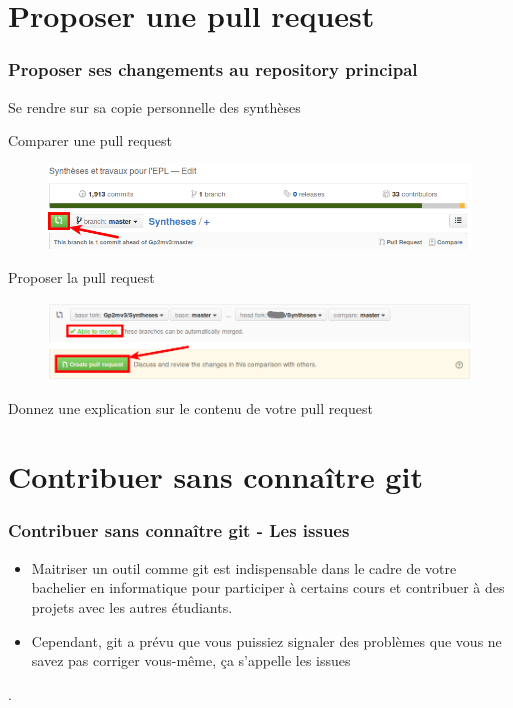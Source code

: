 \documentclass{beamer}
\newenvironment{wideitemize}{\itemize\addtolength{\itemsep}{10pt}}{\enditemize}
\begin{document}
\section{Proposer une pull request}

\begin{frame}
    \frametitle{Proposer ses changements au repository principal}
    \begin{wideitemize}
        \item Se rendre sur sa copie personnelle des synthèses
        \pause
        \item Comparer une pull request
            \begin{figure}[H]
                \centering
                \includegraphics[width=\linewidth]{pull_request.png}
            \end{figure}
         \pause
         \item Proposer la pull request
            \begin{figure}[H]
                \centering
                \includegraphics[width=\linewidth]{create_pull_request.png}
            \end{figure}
         \pause
         \item Donnez une explication sur le contenu de votre pull request
     \end{wideitemize}
\end{frame}

\section{Contribuer sans connaître git}

\begin{frame}
    \frametitle{Contribuer sans connaître git - Les issues}
    \begin{itemize}
        \item Maitriser un outil comme git est indispensable dans le
            cadre de votre bachelier en informatique pour participer à
            certains cours et contribuer à des projets avec les autres
            étudiants.
        \item Cependant, git a prévu que vous puissiez signaler des
            problèmes que vous ne savez pas corriger vous-même, ça
            s'appelle les issues
    \end{itemize}
\end{frame}.
\end{document}
